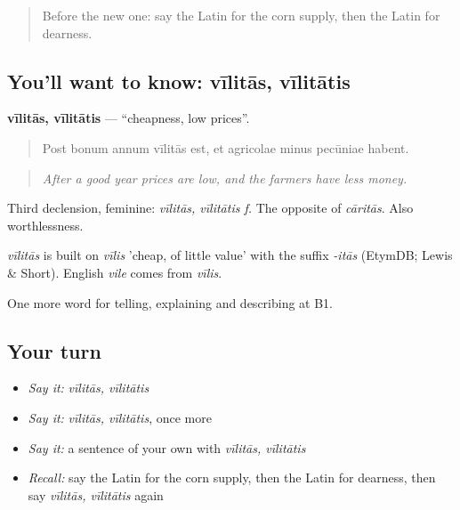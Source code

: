 \label{lesson:LA-C466-vilitas}



\begin{quote}
Before the new one: say the Latin for the corn supply, then the Latin for dearness.
\end{quote}

\subsection*{You'll want to know: vīlitās, vīlitātis}
\textbf{vīlitās, vīlitātis} — \textquotedblleft{}cheapness, low prices\textquotedblright{}.

\begin{quote}
Post bonum annum vīlitās est, et agricolae minus pecūniae habent.
\end{quote}

\begin{quote}
\emph{After a good year prices are low, and the farmers have less money.}
\end{quote}

Third declension, feminine: \emph{vīlitās, vīlitātis f.} The opposite of \emph{cāritās}. Also worthlessness.

\begin{cousinweb}
\emph{vīlitās} is built on \emph{vīlis} 'cheap, of little value' with the suffix \emph{-itās} (EtymDB; Lewis \& Short). English \emph{vile} comes from \emph{vīlis}.
\end{cousinweb}

\begin{grammarlens}[title={What you've built}]
One more word for telling, explaining and describing at B1.
\end{grammarlens}

\subsection*{Your turn}
\begin{itemize}
\raggedright
  \item \emph{Say it:} \emph{vīlitās, vīlitātis}
  \item \emph{Say it:} \emph{vīlitās, vīlitātis}, once more
  \item \emph{Say it:} a sentence of your own with \emph{vīlitās, vīlitātis}
  \item \emph{Recall:} say the Latin for the corn supply, then the Latin for dearness, then say \emph{vīlitās, vīlitātis} again
\end{itemize}

